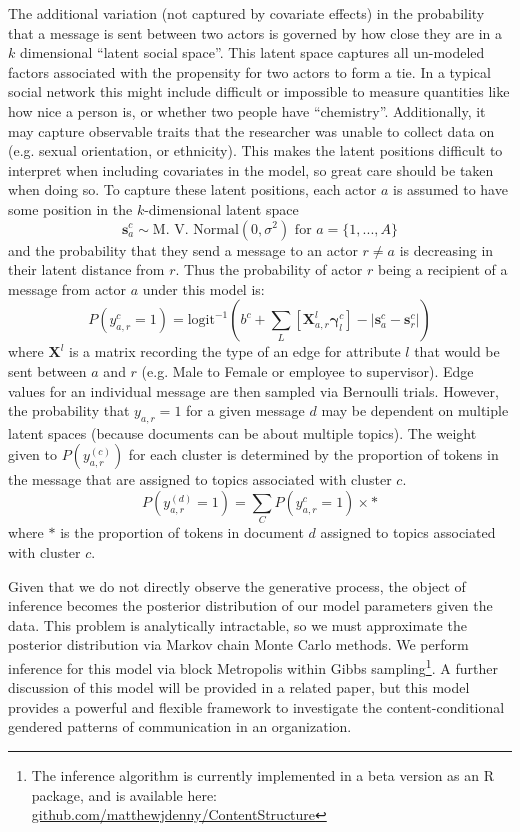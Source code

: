 \documentclass{pnastwo}
\begin{document}
\begin{article}
The additional variation (not captured by covariate effects) in the probability that a message is sent between two actors is governed by how close they are in a $k$ dimensional ``latent social space''. This latent space captures all un-modeled factors associated with the propensity for two actors to form a tie. In a typical social network this might include difficult or impossible to measure quantities like how nice a person is, or whether two people have ``chemistry''. Additionally, it may capture observable traits that the researcher was unable to collect data on (e.g. sexual orientation, or ethnicity). This makes the latent positions difficult to interpret when including covariates in the model, so great care should be taken when doing so. To capture these latent positions, each actor $a$ is assumed to have some position in the $k$-dimensional latent space
\begin{equation}
	\mathbf{s}_a^{c} \sim \text{M. V. Normal}(0, \sigma^2) \text{ for } a = \{1, ...,A\}
\end{equation}
and the probability that they send a message to an actor $r \neq a$ is decreasing in their latent distance from $r$. Thus the probability of actor $r$ being a recipient of a message from actor $a$ under this model is:
\begin{equation}
	P(y_{a,r}^{c} = 1) = \text{logit}^{-1}\left( b^c + \sum_L \left[\mathbf{X}_{a,r}^{l} \mathbf{\gamma}_l^{c}\right] - |\mathbf{s}_a^{c} - \mathbf{s}_r^{c}| \right)
\end{equation}
where $\mathbf{X}^{l}$ is a matrix recording the type of an edge for attribute $l$ that would be sent between $a$ and $r$ (e.g. Male to Female or employee to supervisor). Edge values for an individual message are then sampled via Bernoulli trials. However, the probability that $y_{a,r} = 1$ for a given message $d$ may be dependent on multiple latent spaces (because documents can be about multiple topics). The weight given to $P(y_{a,r}^{(c)})$ for each cluster is determined by the proportion of tokens in the message that are assigned to topics associated with cluster $c$.  
\begin{equation}
	P(y_{a,r}^{(d)} = 1) = \sum_C P(y_{a,r}^{c} = 1) \times *
\end{equation}
where $*$ is the proportion of tokens in document $d$ assigned to topics associated with cluster $c$.

Given that we do not directly observe the generative process, the object of inference becomes the posterior distribution of our model parameters given the data. This problem is analytically intractable, so we must approximate the posterior distribution via Markov chain Monte Carlo methods. We perform inference for this model via block Metropolis within Gibbs sampling\footnote{The inference algorithm is currently implemented in a beta version as an R package, and is available here: \href{https://github.com/matthewjdenny/ContentStructure}{github.com/matthewjdenny/ContentStructure}}. A further discussion of this model will be provided in a related paper, but this model provides a powerful and flexible framework to investigate the content-conditional gendered patterns of communication in an organization. 


\end{article}
\end{document}
